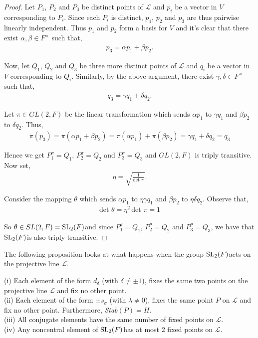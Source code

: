 \begin{proof} Let $P_1$, $P_2$ and $P_3$ be distinct points of $\mathscr{L}$ and $p_i$ be a vector in $V$ corresponding to $P_i$. Since each $P_i$ is distinct, $p_1$, $p_2$ and $p_3$ are thus pairwise linearly independent. Thus $p_1$ and $p_2$  form a basis for $V$ and it's clear that there exist $\alpha, \beta \in F^\times$ such that,
\begin{align*} p_3 = \alpha p_1 + \beta p_2.
\end{align*}

Now, let $Q_1$, $Q_2$ and $Q_3$ be three more distinct points of $\mathscr{L}$ and $q_i$ be a vector in $V$ corresponding to $Q_i$. Similarly, by the above argument, there exist $\gamma, \delta \in F^\times$ such that,
\begin{align*} q_3 = \gamma q_1 + \delta q_2.
\end{align*}

Let $\pi \in GL(2,F)$ be the linear transformation which sends $\alpha p_1$ to $\gamma q_1$  and $\beta p_2$ to $\delta q_2$. Thus,
\begin{align*} \pi(p_3) = \pi(\alpha p_1 + \beta p_2) = \pi(\alpha p_1) + \pi(\beta p_2) = \gamma q_1 + \delta q_2 = q_3 
\end{align*}

Hence we get $P^\pi_1 = Q_1$, $P^\pi_2 = Q_2$ and $P^\pi_3 = Q_3$ and $GL(2,F)$ is triply transitive. Now set,
\begin{align*} \eta = \sqrt{\frac{1}{\text{det }\pi}}.
\end{align*}

Consider the mapping $\theta$ which sends $\alpha p_1$ to $\eta \gamma q_1$ and $\beta p_2$ to $\eta \delta q_2$. Observe that,
\begin{align*} \text{det }\theta = \eta^2 \, \text{det } \pi = 1
\end{align*}

So $\theta \in SL(2,F) = \operatorname{SL}_2(F)$and since $P^\theta_1 = Q_1$, $P^\theta_2 = Q_2$ and $P^\theta_3 = Q_3$, we have that $\operatorname{SL}_2(F)$is also triply transitive. 

\end{proof}

The following proposition looks at what happens when the group $\operatorname{SL}_2(F)$acts on the projective line $\mathscr{L}$.

\begin{proposition} \label{6.7} (i) Each element of the form $d_\delta$ (with $\delta \neq \pm 1$), fixes the same two points on the projective line $\mathscr{L}$ and fix no other point. \vspace{3mm} \\
(ii) Each element of the form $\pm s_\sigma$ (with $\lambda \neq 0$), fixes the same point $P$ on $\mathscr{L}$ and fix no other point. Furthermore, \emph{Stab}$(P) = H$. \vspace{3mm} \\
(iii) All conjugate elements have the same number of fixed points on $\mathscr{L}$. \vspace{3mm} \\
(iv) Any noncentral element of $\operatorname{SL}_2(F)$has at most 2 fixed points on $\mathscr{L}$.
\end{proposition}


